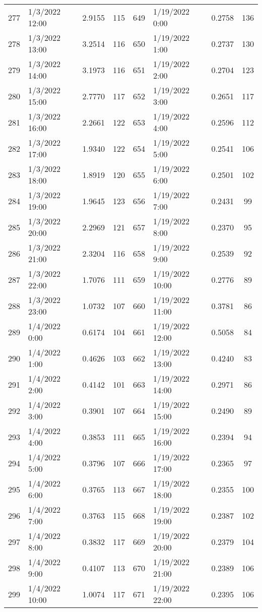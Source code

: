 \begin{center}
\begin{longtable}{llccllcc}
    277&1/3/2022 12:00	   &2.9155&115&649&1/19/2022 0:00	    &0.2758&136 \\
    278&1/3/2022 13:00	   &3.2514&116&650&1/19/2022 1:00	    &0.2737&130 \\
    279&1/3/2022 14:00	   &3.1973&116&651&1/19/2022 2:00	    &0.2704&123 \\
    280&1/3/2022 15:00	   &2.7770&117&652&1/19/2022 3:00	    &0.2651&117 \\
    281&1/3/2022 16:00	   &2.2661&122&653&1/19/2022 4:00	    &0.2596&112 \\
    282&1/3/2022 17:00	   &1.9340&122&654&1/19/2022 5:00	    &0.2541&106 \\
    283&1/3/2022 18:00	   &1.8919&120&655&1/19/2022 6:00	    &0.2501&102 \\
    284&1/3/2022 19:00	   &1.9645&123&656&1/19/2022 7:00	    &0.2431&99  \\
    285&1/3/2022 20:00	   &2.2969&121&657&1/19/2022 8:00	    &0.2370&95  \\
    286&1/3/2022 21:00	   &2.3204&116&658&1/19/2022 9:00	    &0.2539&92  \\
    287&1/3/2022 22:00	   &1.7076&111&659&1/19/2022 10:00	    &0.2776&89  \\
    288&1/3/2022 23:00	   &1.0732&107&660&1/19/2022 11:00	    &0.3781&86  \\
    289&1/4/2022 0:00	   &0.6174&104&661&1/19/2022 12:00	    &0.5058&84  \\
    290&1/4/2022 1:00	   &0.4626&103&662&1/19/2022 13:00	    &0.4240&83  \\
    291&1/4/2022 2:00	   &0.4142&101&663&1/19/2022 14:00	    &0.2971&86  \\
    292&1/4/2022 3:00	   &0.3901&107&664&1/19/2022 15:00	    &0.2490&89  \\
    293&1/4/2022 4:00	   &0.3853&111&665&1/19/2022 16:00	    &0.2394&94  \\
    294&1/4/2022 5:00	   &0.3796&107&666&1/19/2022 17:00	    &0.2365&97  \\
    295&1/4/2022 6:00	   &0.3765&113&667&1/19/2022 18:00	    &0.2355&100 \\
    296&1/4/2022 7:00	   &0.3763&115&668&1/19/2022 19:00	    &0.2387&102 \\
    297&1/4/2022 8:00	   &0.3832&117&669&1/19/2022 20:00	    &0.2379&104 \\
    298&1/4/2022 9:00	   &0.4107&113&670&1/19/2022 21:00	    &0.2389&106 \\
    299&1/4/2022 10:00	   &1.0074&117&671&1/19/2022 22:00	    &0.2395&106 \\

\end{longtable}
\end{center}
